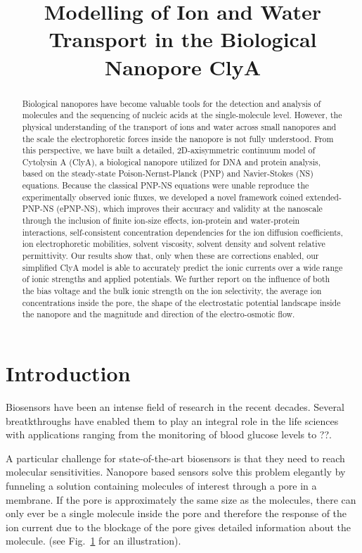 \documentclass[journal=ancac3, manuscript=article, etalmode=truncate,maxauthors=0]{achemso}
\title{Modelling of Ion and Water Transport in the Biological Nanopore ClyA}
\begin{document}
\maketitle
\newpage
\begin{abstract}
Biological nanopores have become valuable tools for the detection and analysis of molecules and the
sequencing of nucleic acids at the single-molecule level. However, the physical understanding of the
transport of ions and water across small nanopores and the scale the electrophoretic forces inside the
nanopore is not fully understood. From this perspective, we have built a detailed, 2D-axisymmetric continuum
model of Cytolysin A (ClyA), a biological nanopore utilized for DNA and protein analysis, based on the
steady-state Poison-Nernst-Planck (PNP) and Navier-Stokes (NS) equations. Because the classical PNP-NS
equations were unable reproduce the experimentally observed ionic fluxes, we developed a novel framework
coined extended-PNP-NS (ePNP-NS), which improves their accuracy and validity at the nanoscale through the
inclusion of finite ion-size effects, ion-protein and water-protein interactions, self-consistent
concentration dependencies for the ion diffusion coefficients, ion electrophoretic mobilities, solvent
viscosity, solvent density and solvent relative permittivity. Our results show that, only when these are 
corrections enabled, our simplified ClyA model is able to accurately predict the ionic currents over a wide 
range of ionic strengths and applied potentials. We further report on the influence of both the bias voltage 
and the bulk ionic strength on the ion selectivity, the average ion concentrations inside the pore, the shape 
of the electrostatic potential landscape inside the nanopore and the magnitude and direction of the 
electro-osmotic flow.
\end{abstract}
\newpage
\section{Introduction}
Biosensors have been an intense field of research in the recent decades.\cite{zhan2015}
Several breatkthroughs have enabled them to play an integral role in the life sciences with
applications ranging from the monitoring of blood glucose levels\cite{chen2013} to ??. 

A particular challenge for state-of-the-art biosensors is that they need to reach molecular
sensitivities.  Nanopore based sensors solve this problem elegantly by funneling a solution
containing molecules of interest through a pore in a membrane. If the pore is approximately the
same size as the molecules, there can only ever be a single molecule inside the pore and therefore the 
response of the ion current due to the blockage of the pore gives detailed information about the molecule. 
(see Fig.~\ref{} for an illustration).
\end{document}
